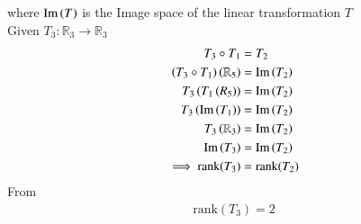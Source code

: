 \documentclass[journal]{IEEEtran}
\begin{document}
where $\text{Im}\left(T\right)$ is the Image space of the linear transformation $T$ \\
Given $T_3 : \mathbb{R}_3 \rightarrow \mathbb{R}_3 $ 
\begin{align}
    T_3 \circ T_1 &= T_2\\
   \left( T_3 \circ T_1\right)\left(\mathbb{R}_5\right) &= \text{Im}\left(T_2\right) \\
   T_3 \left(T_1\left(R_5\right)\right) &= \text{Im}\left(T_2\right) \\
   T_3 \left(\text{Im}\left(T_1\right)\right) &= \text{Im}\left(T_2\right) \\
   T_3 \left(\mathbb{R}_3\right) &= \text{Im}\left(T_2\right) \\
   \text{Im}\left(T_3\right) &= \text{Im}\left(T_2\right) \\
   \implies  \text{rank}(T_3) &= \text{rank}(T_2)
\end{align}
From 
\begin{align}
    \text{rank}(T_3)=2
\end{align}
 
\end{document}
